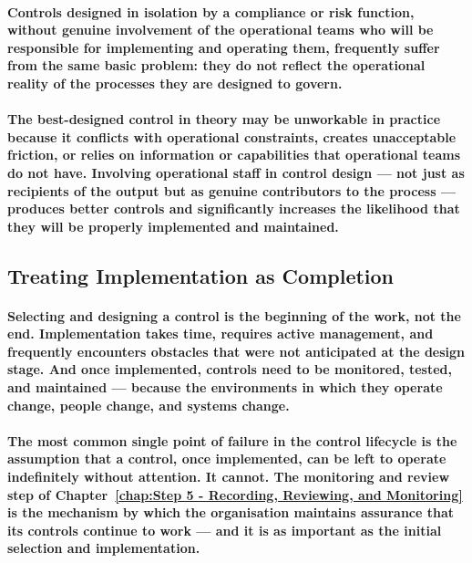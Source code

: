 \paragraph{Controls designed in isolation by a compliance or risk function, without genuine involvement of the operational teams who will be responsible for implementing and operating them, frequently suffer from the same basic problem: they do not reflect the operational reality of the processes they are designed to govern.}
\paragraph{The best-designed control in theory may be unworkable in practice because it conflicts with operational constraints, creates unacceptable friction, or relies on information or capabilities that operational teams do not have. Involving operational staff in control design — not just as recipients of the output but as genuine contributors to the process — produces better controls and significantly increases the likelihood that they will be properly implemented and maintained.}

\subsection{Treating Implementation as Completion}
\paragraph{Selecting and designing a control is the beginning of the work, not the end. Implementation takes time, requires active management, and frequently encounters obstacles that were not anticipated at the design stage. And once implemented, controls need to be monitored, tested, and maintained — because the environments in which they operate change, people change, and systems change.}
\paragraph{The most common single point of failure in the control lifecycle is the assumption that a control, once implemented, can be left to operate indefinitely without attention. It cannot. The monitoring and review step of Chapter~\ref{chap:Step 5 - Recording, Reviewing, and Monitoring} is the mechanism by which the organisation maintains assurance that its controls continue to work — and it is as important as the initial selection and implementation.}


